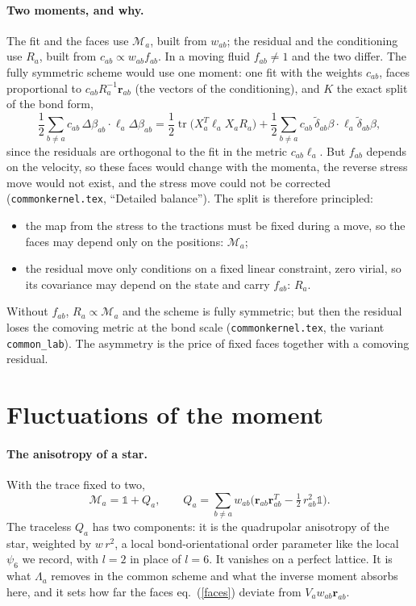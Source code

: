 \documentclass[11pt,aps,preprint,nofootinbib,superscriptaddress,tightenlines]{revtex4-2}
\newcommand{\one}{\mathds{1}}
\def\st{\begin{equation}}
\def\stp{\end{equation}}
\def\Eq#1{eq.~(\ref{#1})}
\def\tr{\operatorname{tr}}
\let\oldparagraph\paragraph
\renewcommand{\paragraph}{\par\bigskip\oldparagraph}
\begin{document}
\paragraph{Two moments, and why.}  The fit and the faces use $\mathcal M_a$, built from $w_{ab}$; the residual and the conditioning use $R_a$,
built from $c_{ab}\propto w_{ab}f_{ab}$.  In a moving fluid $f_{ab}\neq1$ and the two differ.  The fully symmetric scheme would use one moment:
one fit with the weights $c_{ab}$, faces proportional to $c_{ab}R_a^{-1}\bm r_{ab}$ (the vectors of the conditioning), and $K$ the exact split of
the bond form,
\st
\frac12\sum_{b\neq a}c_{ab}\,\Delta\beta_{ab}\cdot\ell_a\Delta\beta_{ab}
=\frac12\tr\big(X_a^T\ell_aX_aR_a\big)+\frac12\sum_{b\neq a}c_{ab}\,\tilde\delta_{ab}\beta\cdot\ell_a\tilde\delta_{ab}\beta ,
\stp
since the residuals are orthogonal to the fit in the metric $c_{ab}\ell_a$.  But $f_{ab}$ depends on the velocity, so these faces would change
with the momenta, the reverse stress move would not exist, and the stress move could not be corrected (\texttt{commonkernel.tex},
``Detailed balance'').  The split is therefore principled:
\begin{itemize}
\item the map from the stress to the tractions must be fixed during a move, so the faces may depend only on the positions: $\mathcal M_a$;
\item the residual move only conditions on a fixed linear constraint, zero virial, so its covariance may depend on the state and carry
  $f_{ab}$: $R_a$.
\end{itemize}
Without $f_{ab}$, $R_a\propto\mathcal M_a$ and the scheme is fully symmetric; but then the residual loses the comoving metric at the bond scale
(\texttt{commonkernel.tex}, the variant \texttt{common\_lab}).  The asymmetry is the price of fixed faces together with a comoving residual.

\section{Fluctuations of the moment}
\label{sec:fluct}

\paragraph{The anisotropy of a star.}  With the trace fixed to two,
\st
\mathcal M_a=\one+Q_a,\qquad Q_a=\sum_{b\neq a}w_{ab}\Big(\bm r_{ab}\bm r_{ab}^T-\tfrac12\,r_{ab}^2\one\Big) .
\stp
The traceless $Q_a$ has two components: it is the quadrupolar anisotropy of the star, weighted by $w\,r^2$, a local bond-orientational order
parameter like the local $\psi_6$ we record, with $l=2$ in place of $l=6$.  It vanishes on a perfect lattice.  It is what $\Lambda_a$ removes in the
common scheme and what the inverse moment absorbs here, and it sets how far the faces \Eq{faces} deviate from $V_aw_{ab}\bm r_{ab}$.
\end{document}
